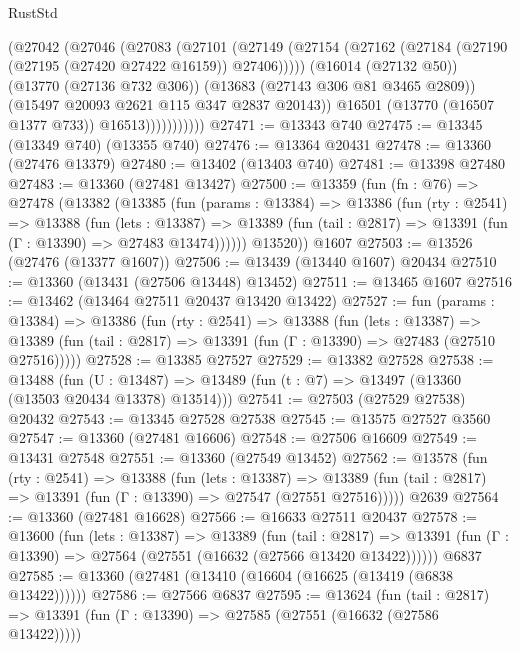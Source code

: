 \begin{lexlean}{RustStd}
\begin{coremodule}
                    (@27042
                      (@27046
                        (@27083
                          (@27101
                            (@27149
                              (@27154
                                (@27162 (@27184 (@27190 (@27195 (@27420 @27422 @16159)) @27406)))))
                            (@16014 (@27132 @50))
                            (@13770 (@27136 @732 @306))
                            (@13683 (@27143 @306 @81 @3465 @2809))
                            (@15497 @20093 @2621 @115 @347 @2837 @20143))
                          @16501
                          (@13770 (@16507 @1377 @733))
                          @16513)))))))))))
@27471 := @13343 @740
@27475 := @13345 (@13349 @740) (@13355 @740)
@27476 := @13364 @20431
@27478 := @13360 (@27476 @13379)
@27480 := @13402 (@13403 @740)
@27481 := @13398 @27480
@27483 := @13360 (@27481 @13427)
@27500 := @13359
    (fun (fn : @76) =>
    @27478
      (@13382
        (@13385
          (fun (params : @13384) =>
          @13386
            (fun (rty : @2541) =>
            @13388
              (fun (lets : @13387) =>
              @13389 (fun (tail : @2817) => @13391 (fun (Γ : @13390) => @27483 @13474))))))
        @13520))
    @1607
@27503 := @13526 (@27476 (@13377 @1607))
@27506 := @13439 (@13440 @1607) @20434
@27510 := @13360 (@13431 (@27506 @13448) @13452)
@27511 := @13465 @1607
@27516 := @13462 (@13464 @27511 @20437 @13420 @13422)
@27527 := fun (params : @13384) =>
  @13386
    (fun (rty : @2541) =>
    @13388
      (fun (lets : @13387) =>
      @13389 (fun (tail : @2817) => @13391 (fun (Γ : @13390) => @27483 (@27510 @27516)))))
@27528 := @13385 @27527
@27529 := @13382 @27528
@27538 := @13488
    (fun (U : @13487) => @13489 (fun (t : @7) => @13497 (@13360 (@13503 @20434 @13378) @13514)))
@27541 := @27503 (@27529 @27538) @20432
@27543 := @13345 @27528 @27538
@27545 := @13575 @27527 @3560
@27547 := @13360 (@27481 @16606)
@27548 := @27506 @16609
@27549 := @13431 @27548
@27551 := @13360 (@27549 @13452)
@27562 := @13578
    (fun (rty : @2541) =>
    @13388
      (fun (lets : @13387) =>
      @13389 (fun (tail : @2817) => @13391 (fun (Γ : @13390) => @27547 (@27551 @27516)))))
    @2639
@27564 := @13360 (@27481 @16628)
@27566 := @16633 @27511 @20437
@27578 := @13600
    (fun (lets : @13387) =>
    @13389
      (fun (tail : @2817) =>
      @13391 (fun (Γ : @13390) => @27564 (@27551 (@16632 (@27566 @13420 @13422))))))
    @6837
@27585 := @13360 (@27481 (@13410 (@16604 (@16625 (@13419 (@6838 @13422))))))
@27586 := @27566 @6837
@27595 := @13624
    (fun (tail : @2817) => @13391 (fun (Γ : @13390) => @27585 (@27551 (@16632 (@27586 @13422)))))

\end{coremodule}
\end{lexlean}
